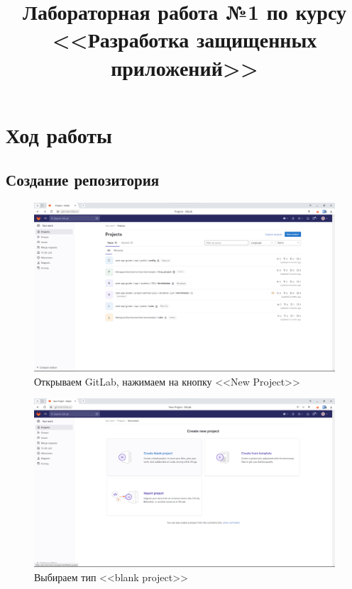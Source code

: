 \documentclass[a4paper]{article}
\title{
  Лабораторная работа №1 по курсу \\
  <<Разработка защищенных приложений>>  
}
\begin{document}
  \templatedtitlepage
  
  \toc
  \section{Ход работы}

  \subsection{Создание репозитория}

  \begin{figure}[H]
    \centering
    \includegraphics[width=\textwidth]{1_ (60)}
    \caption{Открываем GitLab, нажимаем на кнопку <<New Project>>}
  \end{figure}

  \begin{figure}[H]
    \centering
    \includegraphics[width=\textwidth]{1_ (59)}
    \caption{Выбираем тип <<blank project>>}
  \end{figure}
\end{document}
